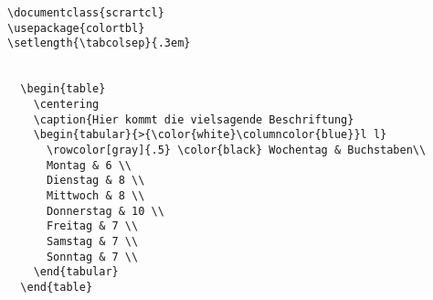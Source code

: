 % 

\begin{lstlisting}
\documentclass{scrartcl}
\usepackage{colortbl}
\setlength{\tabcolsep}{.3em}


  \begin{table}
    \centering
    \caption{Hier kommt die vielsagende Beschriftung}
    \begin{tabular}{>{\color{white}\columncolor{blue}}l l}
      \rowcolor[gray]{.5} \color{black} Wochentag & Buchstaben\\
      Montag & 6 \\
      Dienstag & 8 \\
      Mittwoch & 8 \\
      Donnerstag & 10 \\
      Freitag & 7 \\
      Samstag & 7 \\
      Sonntag & 7 \\
    \end{tabular}
  \end{table}

\end{lstlisting}